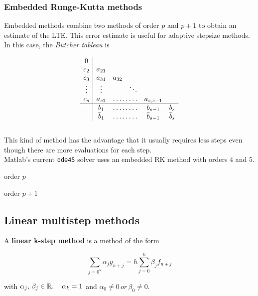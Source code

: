 \subsubsection{Embedded Runge-Kutta methods}

Embedded methods combine two methods of order $p$ and $p+1$ to obtain an estimate of the LTE. This error estimate is useful for adaptive stepsize methods. \\

In this case, the \textit{Butcher tableau} is

$$\begin{array}{c|c c c c c}
     0                                                                   \\
     c_2    & a_{21}                                                     \\
     c_3    & a_{31}            & a_{32}                                 \\
     \vdots & \vdots            &                  & \ddots              \\
     c_s    & a_{s1}            & \hdotsfor{2}               & a_{s,s-1} \\
     \hline
            & b_1               & \hdotsfor{2}               & b_{s-1}   & b_s  \\
            & \overline{b}_1    & \hdotsfor{2}               & \overline{b}_{s-1}  &\overline{b}_s
\end{array}$$\-\\
This kind of method has the advantage that it usually requires less steps even though there are more evaluations for each step.\\

Matlab's current \texttt{ode45} solver uses an embedded RK method with orders $4$ and $5$.

\vspace{-3.5cm}\hspace{11.2cm}order $p$

\vspace{+0.05cm}\hspace{11.2cm}order $p+1$

\newpage
\subsection{Linear multistep methods}

\begin{definition}
  A \textbf{linear k-step method} is a method of the form
  
  \[
    \sum_{j=0^k}\alpha_jy_{n+j} = h\sum_{j=0}^k\beta_jf_{n+j}
  \]
  
  with $\alpha_j,\,\beta_j\in\mathbb{R}, \quad \alpha_k = 1$ and $\alpha_0 \not=0 \, or \, \beta_0\not= 0$. \\
\end{definition}

